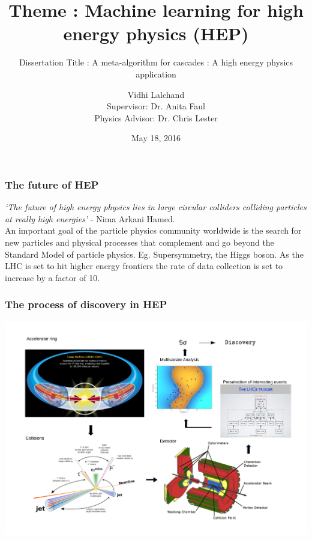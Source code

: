 \documentclass[pdf]{beamer}
\title{Theme : Machine learning for high energy physics (HEP)}
\subtitle{Dissertation Title : A meta-algorithm for cascades : A high energy physics application}
\author{Vidhi Lalchand\\
Supervisor: Dr. Anita Faul\\
Physics Advisor: Dr. Chris Lester}
\date{May 18, 2016}
\begin{document}
\begin{frame}
\titlepage
\end{frame}

{
\begin{frame}
\frametitle{The future of HEP}
\textcolor{cambridgedarkorange}{
\textit{`The future of high energy physics lies in large circular colliders colliding particles at really high energies'} - Nima Arkani Hamed.}\\
\bigskip
An important goal of the particle physics community worldwide is the search for new particles and physical processes that complement and go beyond the Standard Model of particle physics. Eg. Supersymmetry, the Higgs boson.
As the LHC is set to hit higher energy frontiers the rate of data collection is set to increase by a factor of 10.
\end{frame}
}

\begin{frame}
\frametitle{The process of discovery in HEP}
\includegraphics[scale=0.4]{discovery.pdf}
\end{frame}
\end{document}
